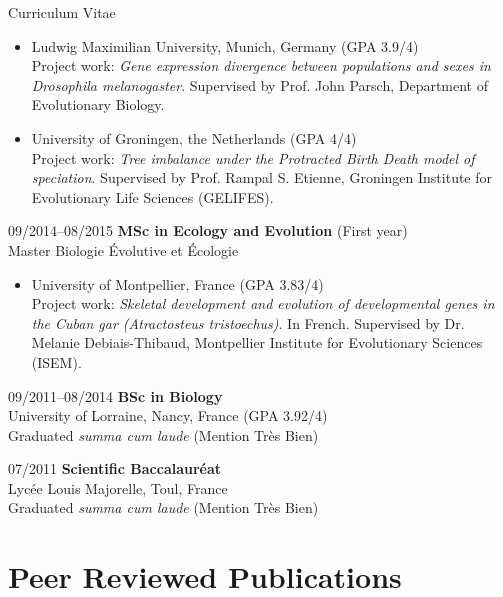 \documentclass[11pt,a4paper]{article}
\begin{document}
\begin{cv}{Curriculum Vitae}
\begin{cvlist}{}
\begin{itemize}
                \item Ludwig Maximilian University, Munich, Germany (GPA 3.9/4)\\
                Project work: \textit{Gene expression divergence between populations and sexes in \textit{Drosophila melanogaster}}. Supervised by Prof. John Parsch, Department of Evolutionary Biology.
                
                \item University of Groningen, the Netherlands (GPA 4/4)\\
                Project work: \textit{Tree imbalance under the Protracted Birth Death model of speciation}. Supervised by Prof. Rampal S. Etienne, Groningen Institute for Evolutionary Life Sciences (GELIFES).
            \end{itemize}
            	
			\item[09/2014--08/2015] 
			\textbf{MSc in Ecology and Evolution} (First year)\\
			Master Biologie Évolutive et Écologie

            \begin{itemize}
                \item University of Montpellier, France (GPA 3.83/4)\\
                Project work: \textit{Skeletal development and evolution of developmental genes in the Cuban gar (\textit{Atractosteus tristoechus})}. In French. Supervised by Dr. Melanie Debiais-Thibaud, Montpellier Institute for Evolutionary Sciences (ISEM).
            \end{itemize}
			
			\item[09/2011--08/2014] 
			\textbf{BSc in Biology}\\
			University of Lorraine, Nancy, France (GPA 3.92/4)\\
			Graduated \textit{summa cum laude} (Mention Tr\`{e}s Bien)
			 
			\item[07/2011] 
			\textbf{Scientific Baccalaur\'{e}at}\\
			Lyc\'{e}e Louis Majorelle, Toul, France\\
			Graduated \textit{summa cum laude} (Mention Tr\`{e}s Bien)
			
		\end{cvlist}
	
		\section{Peer Reviewed Publications}
		

\end{cv}
\end{document}
